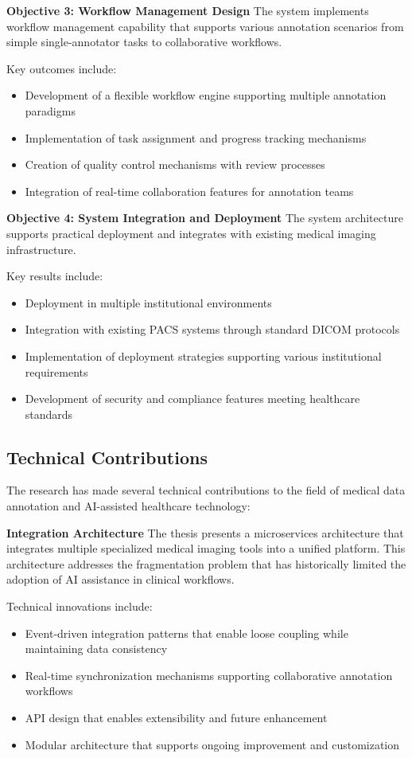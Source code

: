 \textbf{Objective 3: Workflow Management Design}
The system implements workflow management capability that supports various annotation scenarios from simple single-annotator tasks to collaborative workflows.

Key outcomes include:
\begin{itemize}
    \item Development of a flexible workflow engine supporting multiple annotation paradigms
    \item Implementation of task assignment and progress tracking mechanisms
    \item Creation of quality control mechanisms with review processes
    \item Integration of real-time collaboration features for annotation teams
\end{itemize}

\textbf{Objective 4: System Integration and Deployment}
The system architecture supports practical deployment and integrates with existing medical imaging infrastructure.

Key results include:
\begin{itemize}
    \item Deployment in multiple institutional environments
    \item Integration with existing PACS systems through standard DICOM protocols
    \item Implementation of deployment strategies supporting various institutional requirements
    \item Development of security and compliance features meeting healthcare standards
\end{itemize}

\subsection{Technical Contributions}

The research has made several technical contributions to the field of medical data annotation and AI-assisted healthcare technology:

\textbf{Integration Architecture}
The thesis presents a microservices architecture that integrates multiple specialized medical imaging tools into a unified platform. This architecture addresses the fragmentation problem that has historically limited the adoption of AI assistance in clinical workflows.

Technical innovations include:
\begin{itemize}
    \item Event-driven integration patterns that enable loose coupling while maintaining data consistency
    \item Real-time synchronization mechanisms supporting collaborative annotation workflows
    \item API design that enables extensibility and future enhancement
    \item Modular architecture that supports ongoing improvement and customization
\end{itemize}

